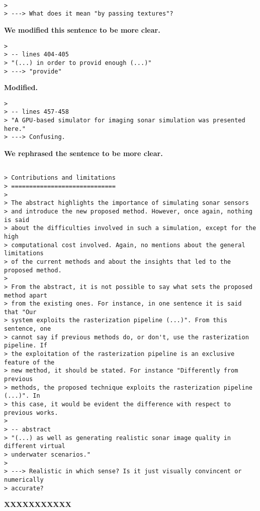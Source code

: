 \documentclass{article}
\begin{document}
\begin{verbatim}

>
> ---> What does it mean "by passing textures"?

\end{verbatim}

\textbf{We modified this sentence to be more clear.}

\begin{verbatim}
>
> -- lines 404-405
> "(...) in order to provid enough (...)"
> ---> "provide"
\end{verbatim}

\textbf{Modified.}

\begin{verbatim}
>
> -- lines 457-458
> "A GPU-based simulator for imaging sonar simulation was presented here."
> ---> Confusing.
\end{verbatim}

\textbf{We rephrased the sentence to be more clear.}

\begin{verbatim}

> Contributions and limitations
> =============================
>
> The abstract highlights the importance of simulating sonar sensors
> and introduce the new proposed method. However, once again, nothing is said
> about the difficulties involved in such a simulation, except for the high
> computational cost involved. Again, no mentions about the general limitations
> of the current methods and about the insights that led to the proposed method.
>
> From the abstract, it is not possible to say what sets the proposed method apart
> from the existing ones. For instance, in one sentence it is said that "Our
> system exploits the rasterization pipeline (...)". From this sentence, one
> cannot say if previous methods do, or don't, use the rasterization pipeline. If
> the exploitation of the rasterization pipeline is an exclusive feature of the
> new method, it should be stated. For instance "Differently from previous
> methods, the proposed technique exploits the rasterization pipeline (...)". In
> this case, it would be evident the difference with respect to previous works.
>
> -- abstract
> "(...) as well as generating realistic sonar image quality in different virtual
> underwater scenarios."
>
> ---> Realistic in which sense? Is it just visually convincent or numerically
> accurate?
\end{verbatim}

\textbf{XXXXXXXXXXX}
\end{document}

